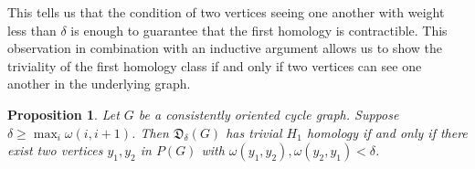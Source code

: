 \documentclass[pdflatex,bst/sn-mathphys-num]{sn-jnl}%
\theoremstyle{thmstyleone}%
\newtheorem{prop}[theorem]{Proposition}%
\theoremstyle{definition}
\theoremstyle{thmstyletwo}%
\newcommand{\FD}{\mathfrak{D}}
\theoremstyle{thmstylethree}%
\begin{document}
    

    


This tells us that the condition of two vertices seeing one another with weight less than $\delta$ is enough to guarantee that the first homology is contractible. This observation in combination with an inductive argument allows us to show the triviality of the first homology class if and only if two vertices can see one another in the underlying graph.


\begin{prop}\label{prop:bidirectionH1}
    Let $G$ be a consistently oriented  cycle graph. Suppose $\delta \geq \max_i \omega(i,i+1)$. Then $\FD_\delta(G)$ has trivial $H_1$ homology if and only if there exist two vertices $y_1,y_2$ in $P(G)$ with $\omega(y_1,y_2),\omega(y_2,y_1)<\delta$.
\end{prop}
\end{document}
